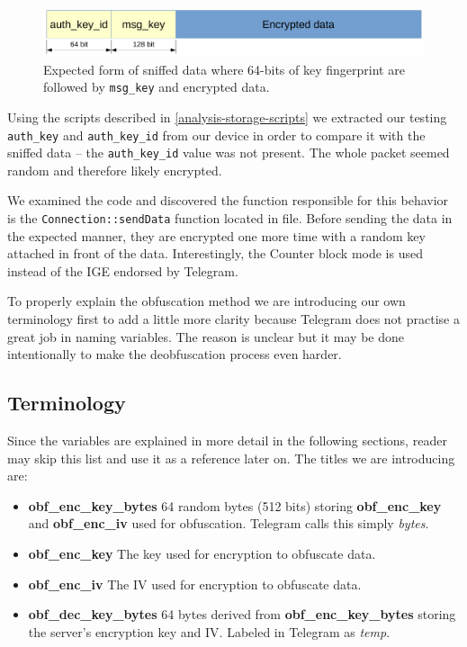 \documentclass[thesis=M,english]{FITthesis}[2012/10/20]
\begin{document}
\begin{figure}[htb]
	\centering
	\includegraphics[width=1\textwidth]{sniffed-expected.pdf}
	\caption[Expected form of sniffed data]{Expected form of sniffed data where 64-bits of key fingerprint are followed by \texttt{msg\_key} and encrypted data.}
	\label{img:analysis-obf-expected}
\end{figure}

Using the scripts described in \ref{analysis-storage-scripts} we extracted our testing \texttt{auth\_key} and \texttt{auth\_key\_id} from our device in order to compare it with the sniffed data -- the \texttt{auth\_key\_id} value was not present. The whole packet seemed random and therefore likely encrypted.

We examined the code and discovered the function responsible for this behavior is the \texttt{Connection::sendData} function located in  file. Before sending the data in the expected manner, they are encrypted one more time with a random key attached in front of the data. Interestingly, the Counter block mode is used instead of the IGE endorsed by Telegram.

To properly explain the obfuscation method we are introducing our own terminology first to add a little more clarity because Telegram does not practise a great job in naming variables. The reason is unclear but it may be done intentionally to make the deobfuscation process even harder.

\subsection{Terminology}

Since the variables are explained in more detail in the following sections, reader may skip this list and use it as a reference later on. The titles we are introducing are:

\begin{itemize}
	\item \textbf{obf\_enc\_key\_bytes} 64 random bytes (512 bits) storing \textbf{obf\_enc\_key} and \textbf{obf\_enc\_iv} used for obfuscation. Telegram calls this simply \emph{bytes}.
	\item \textbf{obf\_enc\_key} The key used for encryption to obfuscate data.
	\item \textbf{obf\_enc\_iv} The IV used for encryption to obfuscate data.
	\item \textbf{obf\_dec\_key\_bytes} 64 bytes derived from \textbf{obf\_enc\_key\_bytes} storing the server's encryption key and IV. Labeled in Telegram as \emph{temp}.
\end{itemize}
\end{document}
